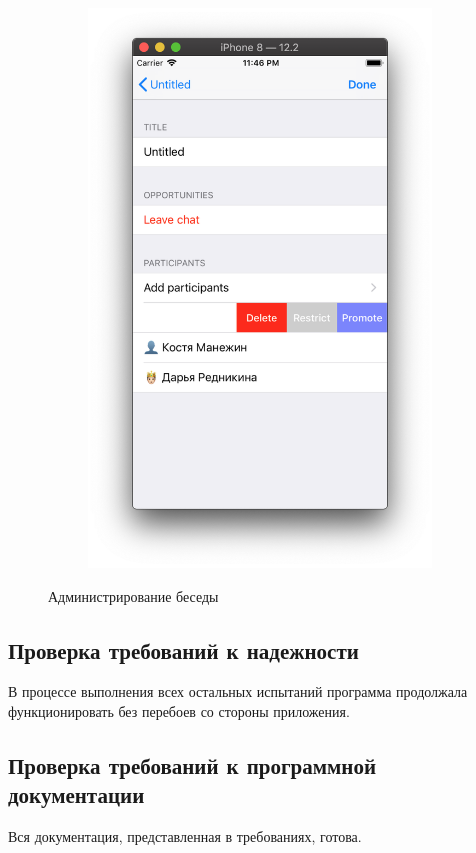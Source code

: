 \documentclass[a4paper,12pt]{article}
\begin{document}
\begin{figure}[h!]
\begin{subfigure}[b]{0.3\linewidth}
			\includegraphics[width=\linewidth]{../includes/pmi/adminChange.png}
		\end{subfigure}
		\caption{\label{pic: admin}Администрирование беседы}
	\end{figure}
	\subsection{Проверка требований к надежности}
	 В процессе выполнения всех остальных испытаний программа продолжала функционировать без перебоев со стороны приложения.
	\subsection{Проверка требований к программной документации}
	Вся документация, представленная в требованиях, готова.
	
\end{document}
